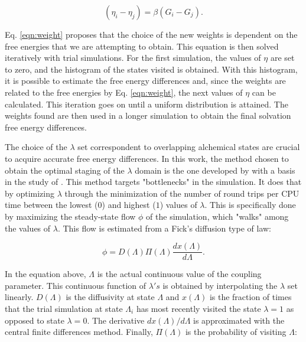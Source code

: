 \begin{equation}
(\eta_{i} - \eta_{j}) = \beta(G_i-G_j).
\label{eqn:weight}
\end{equation}

Eq. \eqref{eqn:weight} proposes that the choice of the new weights is dependent on the free energies that we are attempting to obtain. This equation is then solved iteratively with trial simulations. For the first simulation, the values of $\eta$ are set to zero, and the histogram of the states visited is obtained. With this histogram, it is possible to estimate the free energy differences and, since the weights are related to the free energies by Eq. \eqref{eqn:weight}, the next values of $\eta$ can be calculated. This iteration goes on until a uniform distribution is attained. The weights found are then used in a longer simulation to obtain the final solvation free energy differences.

The choice of the $\lambda$ set correspondent to overlapping alchemical states are crucial to acquire accurate free energy differences. In this work, the method chosen to obtain the optimal staging of the $\lambda$ domain is the one developed by  with a basis in the study of  . This method targets "bottlenecks" in the simulation. It does that by optimizing $\lambda$ through the minimization of the number of round trips per CPU time between the lowest ($0$) and highest ($1$) values of $\lambda$. This is specifically done by maximizing the steady-state flow $\phi$ of the simulation, which "walks" among the values of $\lambda$. This flow is estimated from a Fick's diffusion type of law:

\begin{equation}
\phi = D(\Lambda) \Pi (\Lambda) \dfrac{dx(\Lambda)}{d \Lambda}.
\label{eqn:stream}
\end{equation}

In the equation above, $\Lambda$ is the actual continuous value of the coupling parameter. This continuous function of $\lambda 's$ is obtained by interpolating the $\lambda$ set linearly. $D(\Lambda)$ is the diffusivity at  state $\Lambda$ and $x(\Lambda)$ is the fraction of times that the trial simulation at state $\Lambda_{i}$ has most recently visited the state $\lambda=1$ as opposed to state $\lambda=0$. The derivative ${dx(\Lambda)}/{d \Lambda}$ is approximated with the central finite differences method. Finally, $\Pi (\Lambda)$ is the probability of visiting $\Lambda$:

